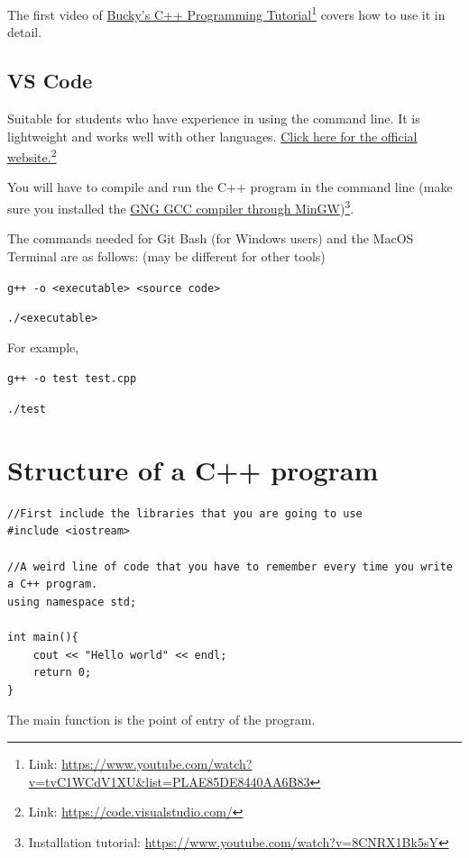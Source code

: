 The first video of \href{https://www.youtube.com/watch?v=tvC1WCdV1XU&list=PLAE85DE8440AA6B83}{Bucky's C++ Programming Tutorial}\footnote{Link: \href{https://www.youtube.com/watch?v=tvC1WCdV1XU&list=PLAE85DE8440AA6B83}{https://www.youtube.com/watch?v=tvC1WCdV1XU\&list=PLAE85DE8440AA6B83}} covers how to use it in detail.

\subsection*{VS Code}

Suitable for students who have experience in using the command line. It is lightweight and works well with other languages. \href{https://code.visualstudio.com/}{Click here for the official website.}\footnote{Link: \href{https://code.visualstudio.com/}{https://code.visualstudio.com/}}

You will have to compile and run the C++ program in the command line (make sure you installed the \href{https://www.youtube.com/watch?v=8CNRX1Bk5sY}{GNG GCC compiler through MinGW})\footnote{Installation tutorial: \href{https://www.youtube.com/watch?v=8CNRX1Bk5sY}{https://www.youtube.com/watch?v=8CNRX1Bk5sY}}.

The commands needed for Git Bash (for Windows users) and the MacOS Terminal are as follows: (may be different for other tools)
\vspace{6mm}

\texttt{g++ -o <executable> <source code>}

\texttt{./<executable>}
\vspace{6mm}

For example,

\texttt{g++ -o test test.cpp}

\texttt{./test}


\section{Structure of a C++ program}
\begin{lstlisting}
//First include the libraries that you are going to use
#include <iostream> 

//A weird line of code that you have to remember every time you write a C++ program.
using namespace std;

int main(){
    cout << "Hello world" << endl;
    return 0;
}
\end{lstlisting}

The main function is the point of entry of the program.


